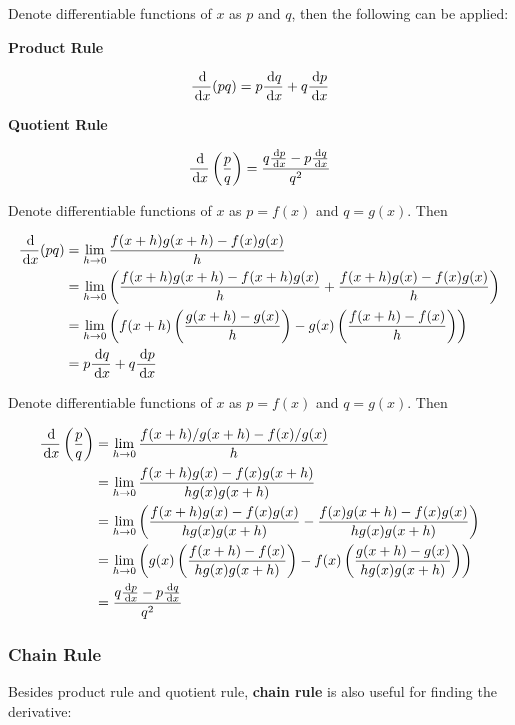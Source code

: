 \documentclass[a4paper,12pt]{article}
\begin{document}
\begin{thm}
  Denote differentiable functions of $x$ as $p$ and $q$, then the following can be applied:

  \begin{alist}
    \item \textbf{Product Rule}

    $$\frac{\,\mathrm{d}}{\,\mathrm{d} x}(pq)=p\frac{\,\mathrm{d} q}{\,\mathrm{d} x}+q\frac{\,\mathrm{d} p}{\,\mathrm{d} x}$$

    \item \textbf{Quotient Rule}

    $$\frac{\,\mathrm{d}}{\,\mathrm{d} x}\left( \frac{p}{q}\right)=\frac{q\frac{\,\mathrm{d} p}{\,\mathrm{d} x}-p\frac{\,\mathrm{d} q}{\,\mathrm{d} x}}{q^{2}}$$
  \end{alist}

  \prf{} Denote differentiable functions of $x$ as $p=f(x)$ and $q=g(x)$. Then

  $$\begin{aligned}[t]
    \frac{\,\mathrm{d}}{\,\mathrm{d} x}(pq)&=\lim_{h\to 0}\frac{f(x+h)g(x+h)-f(x)g(x)}{h}\\
    &=\lim_{h\to 0}\left( \frac{f(x+h)g(x+h)-f(x+h)g(x)}{h}+\frac{f(x+h)g(x)-f(x)g(x)}{h}\right)\\
    &=\lim_{h\to 0}\left( f(x+h)\left( \frac{g(x+h)-g(x)}{h}\right)-g(x)\left( \frac{f(x+h)-f(x)}{h}\right)\right)\\
    &=p\frac{\,\mathrm{d} q}{\,\mathrm{d} x}+q\frac{\,\mathrm{d} p}{\,\mathrm{d} x}
  \end{aligned}$$\s

   Denote differentiable functions of $x$ as $p=f(x)$ and $q=g(x)$. Then

  $$\begin{aligned}[t]
    \frac{\,\mathrm{d}}{\,\mathrm{d} x}\left( \frac{p}{q}\right)&=\lim_{h\to 0}\frac{f(x+h)/g(x+h)-f(x)/g(x)}{h}\\
    &=\lim_{h\to 0}\frac{f(x+h)g(x)-f(x)g(x+h)}{hg(x)g(x+h)}\\
    &=\lim_{h\to 0}\left( \frac{f(x+h)g(x)-f(x)g(x)}{hg(x)g(x+h)}-\frac{f(x)g(x+h)-f(x)g(x)}{hg(x)g(x+h)}\right)\\
    &=\lim_{h\to 0}\left( g(x)\left( \frac{f(x+h)-f(x)}{hg(x)g(x+h)}\right)-f(x)\left( \frac{g(x+h)-g(x)}{hg(x)g(x+h)}\right)\right)\\
    &=\frac{q\frac{\,\mathrm{d} p}{\,\mathrm{d} x}-p\frac{\,\mathrm{d} q}{\,\mathrm{d} x}}{q^{2}}
  \end{aligned}$$
\end{thm}

\subsubsection{Chain Rule}
Besides product rule and quotient rule, \textbf{chain rule} is also useful for finding the derivative:\n
\end{document}
